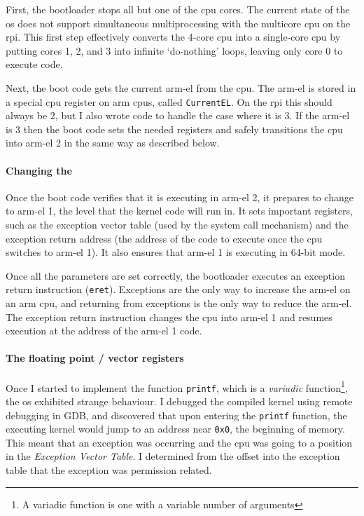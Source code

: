 \documentclass{article}
\begin{document}
First, the bootloader stops all but one of the \gls{cpu} cores. The current
state of the \gls{os} does not support simultaneous multiprocessing with the
multicore \gls{cpu} on the \gls{rpi}. This first step effectively converts the
4-core \gls{cpu} into a single-core \gls{cpu} by putting cores 1, 2, and 3 into
infinite `do-nothing' loops, leaving only core 0 to execute code.

Next, the boot code gets the current \gls{arm-el} from the \gls{cpu}. The
\gls{arm-el} is stored in a special \gls{cpu} register on \gls{arm}
\glspl{cpu}, called \verb!CurrentEL!. On the \gls{rpi} this should always be 2,
but I also wrote code to handle the case where it is 3. If the \gls{arm-el} is
3 then the boot code sets the needed registers and safely transitions the
\gls{cpu} into \gls{arm-el} 2 in the same way as described below.

\paragraph{Changing the \texorpdfstring{}{Exception Level}}
Once the boot code verifies that it is executing in \gls{arm-el} 2, it prepares
to change to \gls{arm-el} 1, the level that the kernel code will run in. It
sets important registers, such as the exception vector table (used by the
system call mechanism) and the exception return address (the address of the
code to execute once the \gls{cpu} switches to \gls{arm-el} 1). It also ensures
that \gls{arm-el} 1 is executing in 64-bit mode.

Once all the parameters are set correctly, the bootloader executes an exception
return instruction (\verb!eret!). Exceptions are the only way to increase the
\gls{arm-el} on an \gls{arm} \gls{cpu}, and returning from exceptions is the
only way to reduce the \gls{arm-el}. The exception return instruction changes
the \gls{cpu} into \gls{arm-el} 1 and resumes execution at the address of the
\gls{arm-el} 1 code.

\paragraph{The floating point / vector registers}
Once I started to implement the function \verb!printf!, which is a
\emph{variadic} function\footnote{A variadic function is one with a variable
number of arguments}, the \gls{os} exhibited strange behaviour. I debugged the
compiled kernel using remote debugging in GDB, and discovered that upon
entering the \verb!printf! function, the executing kernel would jump to an
address near \texttt{0x0}, the beginning of memory. This meant that an
exception was occurring and the \gls{cpu} was going to a position in the
\emph{Exception Vector Table}. I determined from the offset into the exception
table that the exception was permission related.
\end{document}
